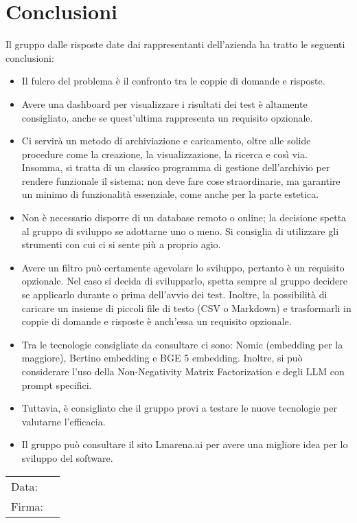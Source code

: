 \documentclass[a4paper, 12pt]{article}
\begin{document}
\section{Conclusioni}
\label{sec:Conclusioni}
Il gruppo dalle risposte date dai rappresentanti dell’azienda ha tratto le seguenti conclusioni:
\begin{itemize}
    \item Il fulcro del problema è il confronto tra le coppie di domande e risposte. 
    \item Avere una dashboard per visualizzare i risultati dei test è altamente consigliato, anche se quest’ultima rappresenta un requisito opzionale.
    \item Ci servirà un metodo di archiviazione e caricamento, oltre alle solide procedure come la creazione, la visualizzazione, la ricerca e così via. Insomma, si tratta di un classico programma di gestione dell’archivio per rendere funzionale il sistema: non deve fare cose straordinarie, ma garantire un minimo di funzionalità essenziale, come anche per la parte estetica.
    \item Non è necessario disporre di un database remoto o online; la decisione spetta al gruppo di sviluppo se adottarne uno o meno. Si consiglia di utilizzare gli strumenti con cui ci si sente più a proprio agio.
    \item Avere un filtro può certamente agevolare lo sviluppo, pertanto è un requisito opzionale. Nel caso si decida di svilupparlo, spetta sempre al gruppo decidere se applicarlo durante o prima dell'avvio dei test. Inoltre, la possibilità di caricare un insieme di piccoli file di testo (CSV o Markdown) e trasformarli in coppie di domande e risposte è anch'essa un requisito opzionale.
    \item Tra le tecnologie consigliate da consultare ci sono: Nomic (embedding per la maggiore), Bertino embedding e BGE 5 embedding. Inoltre, si può considerare l'uso della Non-Negativity Matrix Factorization e degli LLM con prompt specifici. 
    \item Tuttavia, è consigliato che il gruppo provi a testare le nuove tecnologie per valutarne l'efficacia.
    \item Il gruppo può consultare il sito Lmarena.ai per avere una migliore idea per lo sviluppo del software.
\end{itemize}
\vfill
{\renewcommand{\arraystretch}{2}
\begin{tabular}{l p{5cm}}
    Data: &  \hrulefill \\
    Firma: & \hrulefill \\
\end{tabular}
}
\end{document}
